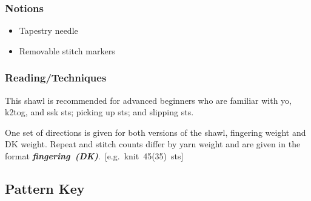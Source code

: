 \documentclass[12pt]{article}
\newcommand{\vocab}[1]{\emph{\textbf{#1}}} %
\begin{document}
\begin{titlingpage}
\begin{multicols}{2}
\vspace{-1em}
\subsubsection*{Notions}
\vspace{-0.7em}
\begin{itemize}
\item Tapestry needle \vspace{-1em}
\item Removable stitch markers
\end{itemize}

\vspace{-2em}

\subsubsection*{Reading/Techniques}

This shawl is recommended for advanced beginners who are familiar with yo, k2tog, and ssk sts; picking up sts; and slipping sts.

\vspace{.5em}
One set of directions is given for both versions of the shawl, fingering weight and DK weight. Repeat and stitch counts differ by yarn weight and are given in the format \mbox{\vocab{fingering (DK)}. [e.g. knit 45(35) sts]} 

\end{multicols}

\end{titlingpage}

\newpage

\subsection*{Pattern Key}
\end{document}
